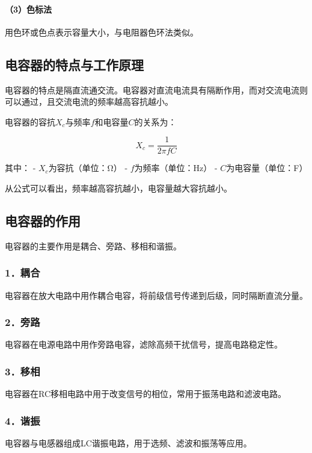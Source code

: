 \documentclass[12pt,UTF8]{ctexbook}
\begin{document}
\paragraph{（3）色标法}
用色环或色点表示容量大小，与电阻器色环法类似。

\subsection{电容器的特点与工作原理}

电容器的特点是隔直流通交流。电容器对直流电流具有隔断作用，而对交流电流则可以通过，且交流电流的频率越高容抗越小。

电容器的容抗$X_c$与频率$f$和电容量$C$的关系为：

\[ X_c = \frac{1}{2\pi f C} \]

其中：
- $X_c$为容抗（单位：Ω）
- $f$为频率（单位：Hz）
- $C$为电容量（单位：F）

从公式可以看出，频率越高容抗越小，电容量越大容抗越小。

\subsection{电容器的作用}

电容器的主要作用是耦合、旁路、移相和谐振。

\subsubsection{1．耦合}

电容器在放大电路中用作耦合电容，将前级信号传递到后级，同时隔断直流分量。

\subsubsection{2．旁路}

电容器在电源电路中用作旁路电容，滤除高频干扰信号，提高电路稳定性。

\subsubsection{3．移相}

电容器在RC移相电路中用于改变信号的相位，常用于振荡电路和滤波电路。

\subsubsection{4．谐振}

电容器与电感器组成LC谐振电路，用于选频、滤波和振荡等应用。
\end{document}
